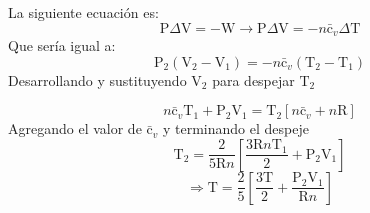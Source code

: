 \documentclass[12pt]{article}
\begin{document}
La siguiente ecuación es:
\begin{displaymath}
	\mathrm{P}\Delta\mathrm{V}=-\mathrm{W} \rightarrow 	\mathrm{P}\Delta\mathrm{V}= -n\mathrm{\bar{c}}_v\Delta\mathrm{T}
\end{displaymath}
Que sería igual a:
\begin{displaymath}
	\mathrm{P}_2(\mathrm{V}_2-\mathrm{V}_1)=-n\mathrm{\bar{c}}_v(\mathrm{T}_2-\mathrm{T}_1)
\end{displaymath}
Desarrollando y sustituyendo $\mathrm{V}_2$ para despejar $\mathrm{T}_2$

\begin{displaymath}
	n\mathrm{\bar{c}}_v\mathrm{T}_1+\mathrm{P}_2\mathrm{V}_1=\mathrm{T}_2\left[ n\mathrm{\bar{c}}_v+n\mathrm{R} \right]
\end{displaymath}
Agregando el valor de $\mathrm{\bar{c}}_v$ y terminando el despeje
\begin{displaymath}
	\mathrm{T}_2=\frac{2}{5\mathrm{R}n}\left[ \frac{3\mathrm{R}n\mathrm{T}_1}{2}+\mathrm{P}_2\mathrm{V}_1 \right]
\end{displaymath}
\begin{displaymath}
	\Rightarrow	\mathrm{T}=\frac{2}{5}\left[ \frac{3\mathrm{T}}{2}+\frac{\mathrm{P}_2\mathrm{V}_1}{\mathrm{R}n} \right]
\end{displaymath}
\end{document}
